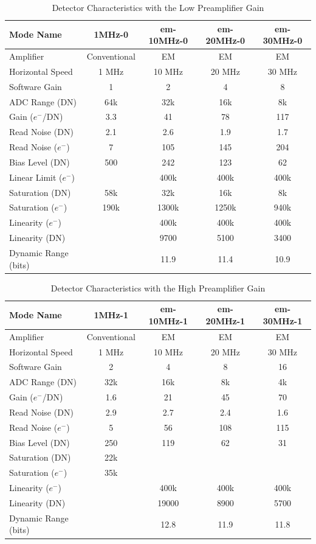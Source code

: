 \begin{table}
    \centering
    \begin{tabular}{lcccc}
    \hline
    Mode Name&1MHz-0&em-10MHz-0&em-20MHz-0&em-30MHz-0\\
    \hline
    Amplifier&Conventional&EM&EM&EM\\
    Horizontal Speed&1 MHz&10 MHz&20 MHz&30 MHz\\
    Software Gain&1&2&4&8\\
    ADC Range (DN)&64k&32k&16k&8k\\
    Gain ($e^-$/DN)&3.3&41&78&117\\
    Read Noise (DN)&2.1&2.6&1.9&1.7\\
    Read Noise ($e^-$)&7&105&145&204\\
    Bias Level (DN)&500&242&123&62\\
    Linear Limit ($e^-$)&&400k&400k&400k\\
    Saturation (DN)&58k&32k&16k&8k\\
    Saturation ($e^-$)&190k&1300k&1250k&940k\\
    Linearity ($e^-$)&&400k&400k&400k\\
    Linearity (DN)&&9700&5100&3400\\
    Dynamic Range (bits)&&11.9&11.4&10.9\\
    \hline
    \end{tabular}
    \caption{Detector Characteristics with the Low Preamplifier Gain}
    \label{table:detector-characteristics-low-gain}
\end{table}

\begin{table}
    \centering
    \begin{tabular}{lcccc}
    \hline
    Mode Name&1MHz-1&em-10MHz-1&em-20MHz-1&em-30MHz-1\\
    \hline
    Amplifier&Conventional&EM&EM&EM\\
    Horizontal Speed&1 MHz&10 MHz&20 MHz&30 MHz\\
    Software Gain&2&4&8&16\\
    ADC Range (DN)&32k&16k&8k&4k\\
    Gain ($e^-$/DN)&1.6&21&45&70\phantom{0}\\
    Read Noise (DN)&2.9&2.7&2.4&1.6\\
    Read Noise ($e^-$)&5&56&108&115\\
    Bias Level (DN)&250&119&62&31\\
    Saturation (DN)&22k&\\
    Saturation ($e^-$)&35k&\\
    Linearity ($e^-$)&&400k&400k&400k\\
    Linearity (DN)&&19000&8900&5700\\
    Dynamic Range (bits)&&12.8&11.9&11.8\\
    \hline
    \end{tabular}
    \caption{Detector Characteristics with the High Preamplifier Gain}
    \label{table:detector-characteristics-high-gain}
\end{table}



